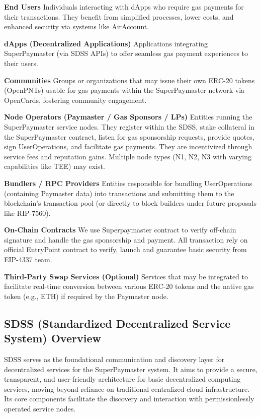 \documentclass[preprint,12pt]{elsarticle}
\begin{document}
\textbf{End Users} Individuals interacting with dApps who require gas payments for their transactions. They benefit from simplified processes, lower costs, and enhanced security via systems like AirAccount.

\textbf{dApps (Decentralized Applications)} Applications integrating SuperPaymaster (via SDSS APIs) to offer seamless gas payment experiences to their users.

\textbf{Communities} Groups or organizations that may issue their own ERC-20 tokens (OpenPNTs) usable for gas payments within the SuperPaymaster network via OpenCards, fostering community engagement.

\textbf{Node Operators (Paymaster / Gas Sponsors / LPs)} Entities running the SuperPaymaster service nodes. They register within the SDSS, stake collateral in the SuperPaymaster contract, listen for gas sponsorship requests, provide quotes, sign UserOperations, and facilitate gas payments. They are incentivized through service fees and reputation gains. Multiple node types (N1, N2, N3 with varying capabilities like TEE) may exist.

\textbf{Bundlers / RPC Providers} Entities responsible for bundling UserOperations (containing Paymaster data) into transactions and submitting them to the blockchain's transaction pool (or directly to block builders under future proposals like RIP-7560\cite{rip7560}).

\textbf{On-Chain Contracts} We use Superpaymaster contract to verify off-chain signature and handle the gas sponsorship and payment. All transaction rely on official EntryPoint contract to verify, launch and guarantee basic security from EIP-4337 team.

\textbf{Third-Party Swap Services (Optional)} Services that may be integrated to facilitate real-time conversion between various ERC-20 tokens and the native gas token (e.g., ETH) if required by the Paymaster node.

\subsection{SDSS (Standardized Decentralized Service System) Overview}
\label{subsec:sdss-overview}

SDSS serves as the foundational communication and discovery layer for decentralized services for the SuperPaymaster system. It aims to provide a secure, transparent, and user-friendly architecture for basic decentralized computing services, moving beyond reliance on traditional centralized cloud infrastructure. Its core components facilitate the discovery and interaction with permissionlessly operated service nodes.
\end{document}
